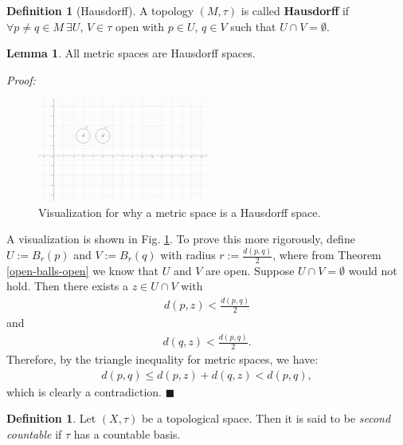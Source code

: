 \documentclass[12pt, a4paper]{article}
\numberwithin{equation}{section}
\theoremstyle{definition}
\theoremstyle{definition}
\newtheorem{defn}[thm]{Definition} %
\newtheorem{lemma}[thm]{Lemma} %
\begin{document}
	\begin{defn}[Hausdorff]
		A topology $\left(M, \tau\right)$ is called \textbf{Hausdorff} if $\forall p\ne q \in M \ \exists U$, $V\in \tau$ open with $p\in U$, $q\in V$ such that $U\cap V = \emptyset$.  
	\end{defn} 

	\begin{lemma}
		All metric spaces are Hausdorff spaces. 
	\end{lemma}
	\noindent\textit{Proof:} 
	\begin{figure}[h!]		
		\centering 
		\includegraphics[trim = {3.8cm 5.8cm 9.7cm 2.8cm}, width=0.5\textwidth, clip]{Figures/metric-spaces-Hausdorff-spaces-v2.png}
		\caption{Visualization for why a metric space is a Hausdorff space.}
		\label{metric-space-Hausdorff-space}
	\end{figure} 
A visualization is shown in Fig. \ref{metric-space-Hausdorff-space}. To prove this more rigorously, define $U := B_{r}(p)$ and $V:=B_{r}(q)$ with radius $r := \frac{d(p, q)}{2}$, where from Theorem \ref{open-balls-open} we know that $U$ and $V$ are open. Suppose $U\cap V = \emptyset$ would not hold. Then there exists a $z\in U\cap V$ with 
	\begin{align}
		d(p, z) < \frac{d(p, q)}{2}
	\end{align}
	and 
	\begin{align}
		d(q, z) < \frac{d(p, q)}{2}. 
	\end{align}
	Therefore, by the triangle inequality for metric spaces, we have: 
	\begin{align}
		d(p, q) \leq d(p, z) + d(q, z) < d(p, q), 
	\end{align}
	which is clearly a contradiction. 
	\qquad\qquad\qquad\qquad\qquad\qquad\qquad\qquad\qquad\qquad\qquad\qquad\qquad\qquad\quad$\blacksquare$
	
	\begin{defn}
		Let $(X, \tau)$ be a topological space. Then it is said to be \textit{second countable} if $\tau$ has a countable basis. 
	\end{defn}
	
\end{document}
